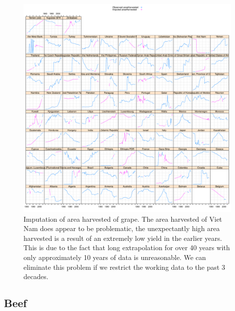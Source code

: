 \documentclass[nojss]{jss}\usepackage[]{graphicx}\usepackage[]{color}
\makeatletter
\def\maxwidth{ %
  \ifdim\Gin@nat@width>\linewidth
    \linewidth
  \else
    \Gin@nat@width
  \fi
}
\newenvironment{knitrout}{}{} %
\makeatother
\begin{document}
\begin{knitrout}
\color{fgcolor}\begin{figure}[!ht]


{\centering \includegraphics[width=\maxwidth]{figure/grape-areaharvested-imputed} 

}

\caption[Imputation of area harvested of grape]{Imputation of area harvested of grape. The area harvested of Viet Nam does appear to be problematic, the unexpectantly high area harvested is a result of an extremely low yield in the earlier years. This is due to the fact that long extrapolation for over 40 years with only approximately 10 years of data is unreasonable. We can eliminate this problem if we restrict the working data to the past 3 decades.\label{fig:grape-areaharvested-imputed}}
\end{figure}


\end{knitrout}


\FloatBarrier
\subsection{Beef}
\end{document}
